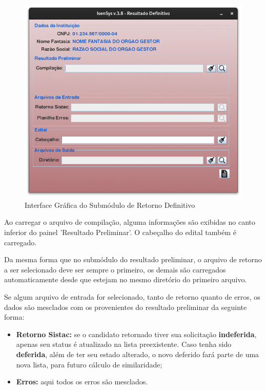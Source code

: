 \documentclass[
	12pt,			%
	openright,		%
	oneside,	
	a4paper,		%
	english,		%
	brazil			%
]{abntex2/abntex2}  %
\begin{document}
	\begin{figure}[H]
		\begin{center}
			
			\caption{Interface Gráfica do Submódulo de Retorno Definitivo}
			\label{retorno-def-ui}
			
			\includegraphics[scale=0.6]{img/retorno-def-ui}
			
		\end{center}
	\end{figure}
	
	Ao carregar o arquivo de compilação, alguma informações são exibidas no canto inferior do painel 'Resultado Preliminar'. O cabeçalho do edital também é carregado.
	
	Da mesma forma que no submódulo do resultado preliminar, o arquivo de retorno a ser selecionado deve ser sempre o primeiro, os demais são carregados automaticamente desde que estejam no mesmo diretório do primeiro arquivo.
	
	Se algum arquivo de entrada for selecionado, tanto de retorno quanto de erros, os dados são mesclados com os provenientes do resultado preliminar da seguinte forma:
	
	\begin{itemize}
		
		\item \textbf{Retorno Sistac:} se o candidato retornado tiver sua solicitação \textbf{indeferida}, apenas seu status é atualizado na lista preexistente. Caso tenha sido \textbf{deferida}, além de ter seu estado alterado, o novo deferido fará parte de uma nova lista, para futuro cálculo de similaridade;
		
		\item \textbf{Erros:} aqui todos os erros são mesclados.
		
	\end{itemize}
	
\end{document}
